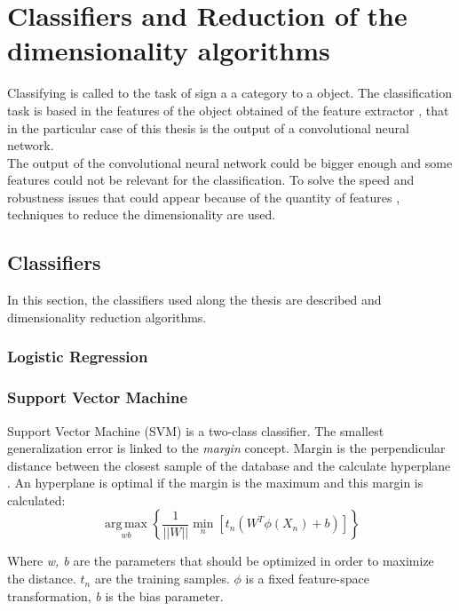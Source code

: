 \section{Classifiers and Reduction of the dimensionality algorithms}
Classifying is called to the task of sign a a category to a object. The classification task is based in the features of the object obtained of the feature extractor \cite{Duda}, that in the particular case of this thesis is the output of a convolutional neural network.\\

The output of the convolutional neural network could be bigger enough and some features could not be relevant for the classification. To solve the speed and robustness issues that could appear because of the quantity of features \cite{PCAvsLDA}, techniques to reduce the dimensionality are used.

\subsection{Classifiers}
In this section, the classifiers used along the thesis are described and dimensionality reduction algorithms.\\

\subsubsection{Logistic Regression}

\subsubsection{Support Vector Machine}
Support Vector Machine (SVM) is a two-class classifier. The smallest generalization error is linked  to the \textit{margin} concept. Margin is the perpendicular distance between the closest sample of the database and the calculate hyperplane \cite{MachineLearning}. An hyperplane is optimal if the margin is the maximum and this margin is calculated:\\

\begin{equation}
\underset{w b}{\operatorname{arg\,max}}\left \{ \frac{1}{||W||} \underset{n}{\operatorname{min}}[t_{n}(W^T \phi (X_n)+b)]   \right \}
\end{equation}

Where \textit{w, b} are the parameters that should be optimized in order to maximize the distance. \textit{$t_n$} are the training samples. $\phi$ is a fixed feature-space transformation, \textit{b} is the bias parameter.\\


